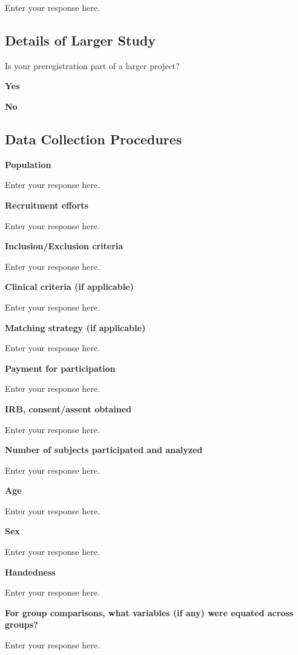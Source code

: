 \documentclass[]{article}
\begin{document}
Enter your response here.

\hypertarget{details-of-larger-study}{%
\subsection{Details of Larger Study}\label{details-of-larger-study}}

Is your preregistration part of a larger project?

\textbf{Yes}

\textbf{No}

\hypertarget{data-collection-procedures}{%
\subsection{Data Collection
Procedures}\label{data-collection-procedures}}

\textbf{Population}

Enter your response here.

\textbf{Recruitment efforts}

Enter your response here.

\textbf{Inclusion/Exclusion criteria}

Enter your response here.

\textbf{Clinical criteria (if applicable)}

Enter your response here.

\textbf{Matching strategy (if applicable)}

Enter your response here.

\textbf{Payment for participation}

Enter your response here.

\textbf{IRB, consent/assent obtained}

Enter your response here.

\textbf{Number of subjects participated and analyzed}

Enter your response here.

\textbf{Age}

Enter your response here.

\textbf{Sex}

Enter your response here.

\textbf{Handedness}

Enter your response here.

\textbf{For group comparisons, what variables (if any) were equated
across groups?}

Enter your response here.
\end{document}

